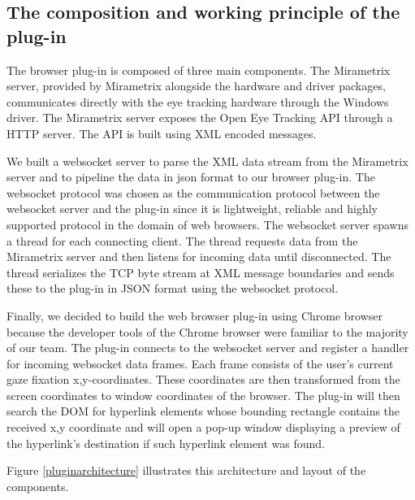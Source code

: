 \documentclass[english]{tktltiki}
\begin{document}
\subsection{The composition and working principle of the plug-in}

The browser plug-in is composed of three main components. The Mirametrix server, provided by Mirametrix alongside the hardware and driver packages, communicates directly with the eye tracking hardware through the Windows driver. The Mirametrix server exposes the Open Eye Tracking API through a HTTP server. The API is built using XML encoded messages.

We built a websocket server to parse the XML data stream from the Mirametrix server and to pipeline the data in json format to our browser plug-in. The websocket protocol was chosen as the communication protocol between the websocket server and the plug-in since it is lightweight, reliable and highly supported protocol in the domain of web browsers. The websocket server spawns a thread for each connecting client. The thread requests data from the Mirametrix server and then listens for incoming data until disconnected. The thread serializes the TCP byte stream at XML message boundaries and sends these to the plug-in in JSON format using the websocket protocol.  

Finally, we decided to build the web browser plug-in using Chrome browser because the developer tools of the Chrome browser were familiar to the majority of our team. The plug-in connects to the websocket server and register a handler for incoming websocket data frames. Each frame consists of the user's current gaze fixation x,y-coordinates. These coordinates are then transformed from the screen coordinates to window coordinates of the browser. The plug-in will then search the DOM for hyperlink elements whose bounding rectangle contains the received x,y coordinate and will open a pop-up window displaying a preview of the hyperlink's destination if such hyperlink element was found.

Figure \ref{pluginarchitecture} illustrates this architecture and layout of the components.
\end{document}
